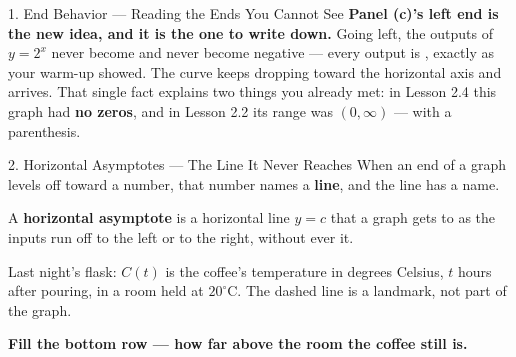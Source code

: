 \documentclass[10pt]{article}
\begin{document}
\begin{notesbox}{1. End Behavior --- Reading the Ends You Cannot See}
\vspace{6pt}
\textbf{Panel (c)'s left end is the new idea, and it is the one to write down.} Going left, the
outputs of $y=2^x$ never become \blank{1.4cm} and never become negative --- every output is
\blank{2.0cm}, exactly as your warm-up showed. The curve keeps dropping toward the horizontal axis
and \blank{1.8cm} arrives. That single fact explains two things you already met: in Lesson 2.4 this
graph had \textbf{no zeros}, and in Lesson 2.2 its range was $(0,\infty)$ --- with a parenthesis.
\end{notesbox}

\vspace{0.10in}

\boxguard[30]
\begin{notesbox}{2. Horizontal Asymptotes --- The Line It Never Reaches}
\small
When an end of a graph levels off toward a number, that number names a \textbf{line}, and the line
has a name.

\vspace{4pt}
A \textbf{horizontal asymptote} is a horizontal line $y=c$ that a graph gets \blank{4.0cm} to as the
inputs run off to the left or to the right, without ever \blank{2.6cm} it.

\vspace{4pt}
\begin{center}
\end{center}

\vspace{-4pt}
{\scriptsize Last night's flask: $C(t)$ is the coffee's temperature in degrees Celsius, $t$ hours
after pouring, in a room held at $20^\circ$C. The dashed line is a landmark, not part of the graph.}

\vspace{4pt}
\textbf{Fill the bottom row --- how far above the room the coffee still is.}


\end{notesbox}
\end{document}
